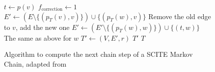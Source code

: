 \begin{figure}[p]
\begin{algorithmic}[1]
                \Else
                    \State $t \leftarrow p(v)$
                    \State $f_\mathrm{correction} \leftarrow 1$
                \EndIf
                \State $E' \leftarrow (E \setminus \{(p_T(v), v)\}) \cup \{(p_T(w), v)\}$ \Comment Remove the old edge to $v$, add the new one
                \State $E' \leftarrow (E' \setminus \{(p_T(w), w)\}) \cup \{(t, w)\}$ \Comment The same as above for $w$
            \EndIf
            \State $T' \leftarrow (V, E', r)$
                \State \Return $T'$
            \Else
                \State \Return $T$
            \EndIf
        \EndFunction
    \end{algorithmic}
    \caption{Algorithm to compute the next chain step of a SCITE Markov Chain, adapted from \cite{tree2016}}
    \label{alg:scite-step}
\end{figure}